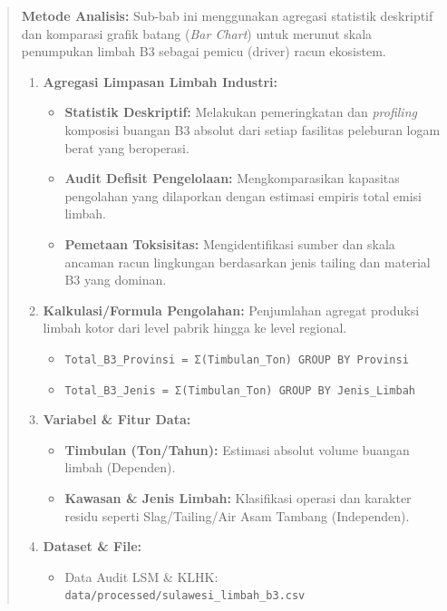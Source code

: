 \documentclass[
]{article}
\providecommand{\tightlist}{%
  \setlength{\itemsep}{0pt}\setlength{\parskip}{0pt}}
\begin{document}
\begin{quote}
\textbf{Metode Analisis:} Sub-bab ini menggunakan agregasi statistik
deskriptif dan komparasi grafik batang (\emph{Bar Chart}) untuk merunut
skala penumpukan limbah B3 sebagai pemicu (driver) racun ekosistem.

\begin{enumerate}
\def\labelenumi{\arabic{enumi}.}
\tightlist
\item
  \textbf{Agregasi Limpasan Limbah Industri:}

  \begin{itemize}
  \tightlist
  \item
    \textbf{Statistik Deskriptif:} Melakukan pemeringkatan dan
    \emph{profiling} komposisi buangan B3 absolut dari setiap fasilitas
    peleburan logam berat yang beroperasi.
  \item
    \textbf{Audit Defisit Pengelolaan:} Mengkomparasikan kapasitas
    pengolahan yang dilaporkan dengan estimasi empiris total emisi
    limbah.
  \item
    \textbf{Pemetaan Toksisitas:} Mengidentifikasi sumber dan skala
    ancaman racun lingkungan berdasarkan jenis tailing dan material B3
    yang dominan.
  \end{itemize}
\item
  \textbf{Kalkulasi/Formula Pengolahan:} Penjumlahan agregat produksi
  limbah kotor dari level pabrik hingga ke level regional.

  \begin{itemize}
  \tightlist
  \item
    \texttt{Total\_B3\_Provinsi\ =\ Σ(Timbulan\_Ton)\ GROUP\ BY\ Provinsi}
  \item
    \texttt{Total\_B3\_Jenis\ =\ Σ(Timbulan\_Ton)\ GROUP\ BY\ Jenis\_Limbah}
  \end{itemize}
\item
  \textbf{Variabel \& Fitur Data:}

  \begin{itemize}
  \tightlist
  \item
    \textbf{Timbulan (Ton/Tahun):} Estimasi absolut volume buangan
    limbah (Dependen).
  \item
    \textbf{Kawasan \& Jenis Limbah:} Klasifikasi operasi dan karakter
    residu seperti Slag/Tailing/Air Asam Tambang (Independen).
  \end{itemize}
\item
  \textbf{Dataset \& File:}

  \begin{itemize}
  \tightlist
  \item
    Data Audit LSM \& KLHK:
    \texttt{data/processed/sulawesi\_limbah\_b3.csv}
  \end{itemize}
\end{enumerate}
\end{quote}
\end{document}
